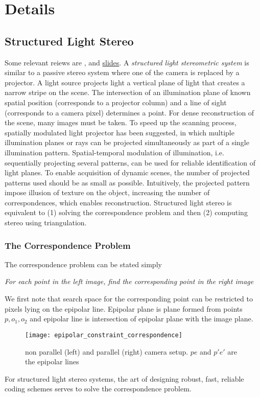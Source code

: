 \documentclass[../writeup.tex]{subfiles}
\begin{document}
  

\section{Details}
 
\subsection{Structured Light Stereo}

Some relevant reiews are \cite{salviPatternCodificationStrategies2004},\cite{salviStateArtStructured2010} and \href{http://www.sci.utah.edu/~gerig/CS6320-S2013/Materials/CS6320-CV-S2012-StructuredLight-II.pdf}{slides}. A \textit{structured light stereometric system} is similar to a passive stereo system where one of the camera is replaced by a projector. A light source projects light a vertical plane of light that creates a narrow stripe on the scene. The intersection of an illumination plane of known spatial position (corresponds to a projector column) and a line of sight (corresponds to a camera pixel) determines a point. For dense reconstruction of the scene, many images must be taken. To speed up the scanning process, spatially modulated light projector has been suggested, in which multiple illumination planes or rays can be projected simultaneously as part of a single illumination pattern. Spatial-temporal modulation of illumination, i.e. sequentially projecting several patterns, can be used for reliable identification of light planes. To enable acquisition of dynamic scenes, the number of projected patterns used should be as small as possible. Intuitively, the projected pattern impose illusion of texture on the object, increasing the number of correspondences, which enables reconstruction. Structured light stereo is equivalent to (1) solving the correspondence problem and then (2) computing stereo using triangulation.


\subsubsection{The Correspondence Problem}

The correspondence problem can be stated simply
\begin{center}
    \textit{
        For each point in the left image, find the corresponding point in the right image
    }
\end{center}
We first note that search space for the corresponding point can be restricted to pixels lying on the epipolar line. Epipolar plane is plane formed from points $p,o_1,o_2$ and epipolar line is intersection of epipolar plane with the image plane.
\begin{figure}[h!]
    \begin{center}
        \texttt{[image: epipolar\_constraint\_correspondence]}
        \caption{non parallel (left) and parallel (right) camera setup. $pe$ and $p'e'$ are the epipolar lines}
    \end{center}
\end{figure}
For structured light stereo systems, the art of designing robust, fast, reliable coding schemes serves to solve the correspondence problem.
\end{document}

